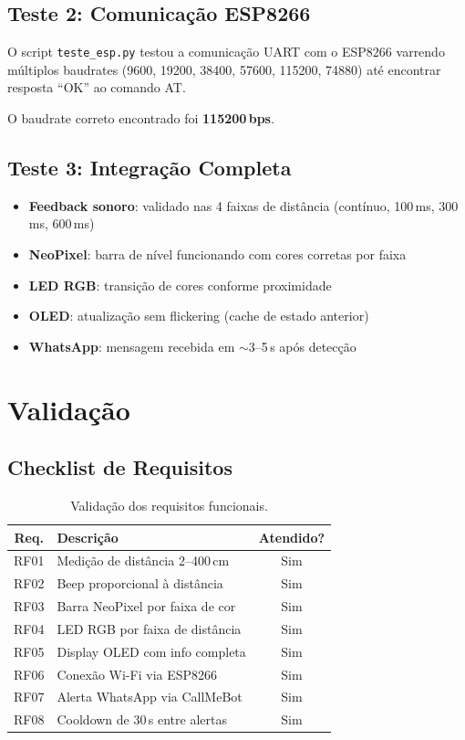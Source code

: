 \documentclass[12pt, a4paper]{article}
\begin{document}
\subsection{Teste 2: Comunicação ESP8266}

O script \texttt{teste\_esp.py} testou a comunicação UART com o ESP8266 varrendo múltiplos baudrates (9600, 19200, 38400, 57600, 115200, 74880) até encontrar resposta ``OK'' ao comando AT.

O baudrate correto encontrado foi \textbf{115200\,bps}.

\subsection{Teste 3: Integração Completa}

\begin{itemize}
  \item \textbf{Feedback sonoro}: validado nas 4 faixas de distância (contínuo, 100\,ms, 300\,ms, 600\,ms)
  \item \textbf{NeoPixel}: barra de nível funcionando com cores corretas por faixa
  \item \textbf{LED RGB}: transição de cores conforme proximidade
  \item \textbf{OLED}: atualização sem flickering (cache de estado anterior)
  \item \textbf{WhatsApp}: mensagem recebida em $\sim$3--5\,s após detecção
\end{itemize}


\section{Validação}
\label{sec:validacao}

\subsection{Checklist de Requisitos}

\begin{table}[H]
\centering
\caption{Validação dos requisitos funcionais.}
\begin{tabular}{clc}
  \toprule
  \textbf{Req.} & \textbf{Descrição} & \textbf{Atendido?} \\
  \midrule
  RF01 & Medição de distância 2--400\,cm & Sim \\
  RF02 & Beep proporcional à distância & Sim \\
  RF03 & Barra NeoPixel por faixa de cor & Sim \\
  RF04 & LED RGB por faixa de distância & Sim \\
  RF05 & Display OLED com info completa & Sim \\
  RF06 & Conexão Wi-Fi via ESP8266 & Sim \\
  RF07 & Alerta WhatsApp via CallMeBot & Sim \\
  RF08 & Cooldown de 30\,s entre alertas & Sim \\
  \bottomrule
\end{tabular}
\end{table}
\end{document}
